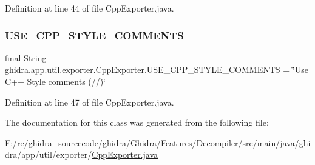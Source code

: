 Definition at line 44 of file Cpp\+Exporter.\+java.

\mbox{\label{classghidra_1_1app_1_1util_1_1exporter_1_1_cpp_exporter_a7abe700c2b065b59172b8e00bae2e4a1}} 
\subsubsection{\texorpdfstring{USE\_CPP\_STYLE\_COMMENTS}{USE\_CPP\_STYLE\_COMMENTS}}
{\footnotesize\ttfamily final String ghidra.\+app.\+util.\+exporter.\+Cpp\+Exporter.\+U\+S\+E\+\_\+\+C\+P\+P\+\_\+\+S\+T\+Y\+L\+E\+\_\+\+C\+O\+M\+M\+E\+N\+TS = \char`\"{}Use C++ Style comments (//)\char`\"{}\hspace{0.3cm}{\ttfamily [static]}}



Definition at line 47 of file Cpp\+Exporter.\+java.



The documentation for this class was generated from the following file\+:\begin{DoxyCompactItemize}
\item 
F\+:/re/ghidra\+\_\+sourcecode/ghidra/\+Ghidra/\+Features/\+Decompiler/src/main/java/ghidra/app/util/exporter/\mbox{\hyperlink{_cpp_exporter_8java}{Cpp\+Exporter.\+java}}\end{DoxyCompactItemize}
